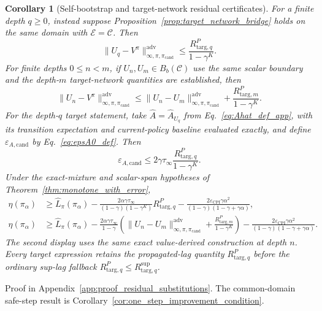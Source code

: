 \documentclass{article}
\theoremstyle{plain}
\newtheorem{corollary}[theorem]{Corollary}
\theoremstyle{definition}
\theoremstyle{remark}
\begin{document}
\begin{corollary}[Self-bootstrap and target-network residual certificates]
For a finite depth $q\ge0$, instead suppose
Proposition~\ref{prop:target_network_bridge} holds on the same domain with
$\mathcal E=\mathcal C$. Then
\begin{equation}
\|U_q-V^\pi\|_{\infty,\pi,\pi_{\mathrm{cand}}}^{\mathrm{adv}}
\le
\frac{R_{\mathrm{targ},q}^{P}}{1-\gamma^K}.
\label{eq:target_network_value_certificate}
\end{equation}
For finite depths $0\le n<m$, if $U_n,U_m\in B_b(\mathcal C)$ use the
same scalar boundary and the depth-$m$ target-network quantities are
established, then
\begin{equation}
\|U_n-V^\pi\|_{\infty,\pi,\pi_{\mathrm{cand}}}^{\mathrm{adv}}
\le
\|U_n-U_m\|_{\infty,\pi,\pi_{\mathrm{cand}}}^{\mathrm{adv}}
+\frac{R_{\mathrm{targ},m}^{P}}{1-\gamma^K}.
\label{eq:target_network_finite_reference}
\end{equation}
For the depth-$q$ target statement, take
$\widehat A=\widehat A_{U_q}$ from Eq.~\eqref{eq:Ahat_def_app}, with its
transition expectation and current-policy baseline evaluated exactly, and
define $\varepsilon_{A,\mathrm{cand}}$ by Eq.~\eqref{eq:epsA0_def}. Then
\begin{equation}
\varepsilon_{A,\mathrm{cand}}
\le
2\gamma\tau_\infty\frac{R_{\mathrm{targ},q}^{P}}{1-\gamma^K}.
\label{eq:target_network_candidate_bias}
\end{equation}
Under the exact-mixture and scalar-span hypotheses of
Theorem~\ref{thm:monotone_with_error},
\begin{align}
\eta(\pi_\alpha)
&\ge
\widehat L_\pi(\pi_\alpha)
-\frac{2\alpha\gamma\tau_\infty}
{(1-\gamma)(1-\gamma^K)}R_{\mathrm{targ},q}^{P}
-\frac{2\varepsilon_{\mathrm{CPI}}\gamma\alpha^2}
{(1-\gamma)(1-\gamma+\gamma\alpha)},
\label{eq:target_network_cpi}\\
\eta(\pi_\alpha)
&\ge
\widehat L_\pi(\pi_\alpha)
-\frac{2\alpha\gamma\tau_\infty}{1-\gamma}
\left(
\|U_n-U_m\|_{\infty,\pi,\pi_{\mathrm{cand}}}^{\mathrm{adv}}
+\frac{R_{\mathrm{targ},m}^{P}}{1-\gamma^K}
\right)
-\frac{2\varepsilon_{\mathrm{CPI}}\gamma\alpha^2}
{(1-\gamma)(1-\gamma+\gamma\alpha)}.
\label{eq:target_network_finite_reference_cpi}
\end{align}
The second display uses the same exact value-derived construction at depth
$n$. Every target expression retains the propagated-lag quantity
$R_{\mathrm{targ},q}^{P}$ before the ordinary sup-lag fallback
$R_{\mathrm{targ},q}^{P}\le R_{\mathrm{targ},q}^{\sup}$.
\end{corollary}
Proof in Appendix~\ref{app:proof_residual_substitutions}.
The common-domain safe-step result is Corollary~\ref{cor:one_step_improvement_condition}.
\end{document}
